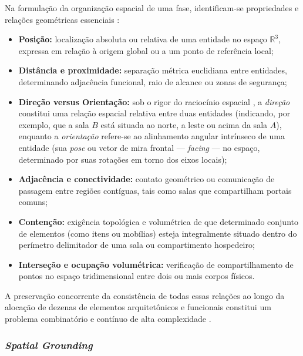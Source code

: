 Na formulação da organização espacial de uma fase, identificam-se propriedades e relações geométricas essenciais \cite{cohn2008qualitative, sun2024roomplanner, xu2025constraint, chen2025narrative}:
\begin{itemize}
    \item \textbf{Posição:} localização absoluta ou relativa de uma entidade no espaço $\mathbb{R}^3$, expressa em relação à origem global ou a um ponto de referência local;
    \item \textbf{Distância e proximidade:} separação métrica euclidiana entre entidades, determinando adjacência funcional, raio de alcance ou zonas de segurança;
    \item \textbf{Direção versus Orientação:} sob o rigor do raciocínio espacial \cite{cohn2008qualitative}, a \textit{direção} constitui uma relação espacial relativa entre duas entidades (indicando, por exemplo, que a sala $B$ está situada ao norte, a leste ou acima da sala $A$), enquanto a \textit{orientação} refere-se ao alinhamento angular intrínseco de uma entidade (sua \textit{pose} ou vetor de mira frontal --- \textit{facing} --- no espaço, determinado por suas rotações em torno dos eixos locais);
    \item \textbf{Adjacência e conectividade:} contato geométrico ou comunicação de passagem entre regiões contíguas, tais como salas que compartilham portais comuns;
    \item \textbf{Contenção:} exigência topológica e volumétrica de que determinado conjunto de elementos (como itens ou mobílias) esteja integralmente situado dentro do perímetro delimitador de uma sala ou compartimento hospedeiro;
    \item \textbf{Interseção e ocupação volumétrica:} verificação de compartilhamento de pontos no espaço tridimensional entre dois ou mais corpos físicos.
\end{itemize}

A preservação concorrente da consistência de todas essas relações ao longo da alocação de dezenas de elementos arquitetônicos e funcionais constitui um problema combinatório e contínuo de alta complexidade \cite{xu2025constraint, feng2026repurposing3dgenerativemodel}.

\subsubsection{\textit{Spatial Grounding}}
\label{sec:conceito_spatial_grounding}

